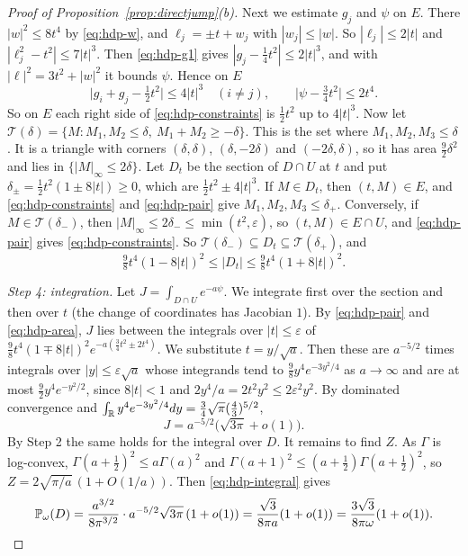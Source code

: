 \begin{proof}[Proof of Proposition~\ref{prop:directjump}(b)]
Next we estimate $g_j$ and $\psi$ on $E$. There $|w|^2\le8t^4$ by
\eqref{eq:hdp-w}, and $\ell_j=\pm t+w_j$ with $|w_j|\le|w|$. So
$|\ell_j|\le2|t|$ and $|\ell_j^2-t^2|\le7|t|^3$. Then \eqref{eq:hdp-g1} gives
$|g_j-\frac14t^2|\le2|t|^3$, and with $|\ell|^2=3t^2+|w|^2$ it bounds $\psi$.
Hence on $E$
\begin{equation}\label{eq:hdp-pair}
 \bigl|g_i+g_j-\tfrac12t^2\bigr|\le4|t|^3\quad(i\ne j),
 \qquad\bigl|\psi-\tfrac34t^2\bigr|\le2t^4.
\end{equation}
So on $E$ each right side of \eqref{eq:hdp-constraints} is $\frac12t^2$ up to
$4|t|^3$. Now let
$\mathcal T(\delta)=\{M:M_1,M_2\le\delta,\ M_1+M_2\ge-\delta\}$. This is the
set where $M_1,M_2,M_3\le\delta$. It is a triangle with corners
$(\delta,\delta)$, $(\delta,-2\delta)$ and $(-2\delta,\delta)$, so it has area
$\frac92\delta^2$ and lies in $\{|M|_\infty\le2\delta\}$. Let $D_t$ be the
section of $D\cap U$ at $t$ and put $\delta_\pm=\frac12t^2(1\pm8|t|)\ge0$,
which are $\frac12t^2\pm4|t|^3$. If $M\in D_t$, then $(t,M)\in E$, and
\eqref{eq:hdp-constraints} and \eqref{eq:hdp-pair} give
$M_1,M_2,M_3\le\delta_+$. Conversely, if $M\in\mathcal T(\delta_-)$, then
$|M|_\infty\le2\delta_-\le\min(t^2,\varepsilon)$, so $(t,M)\in E\cap U$, and
\eqref{eq:hdp-pair} gives \eqref{eq:hdp-constraints}. So
$\mathcal T(\delta_-)\subseteq D_t\subseteq\mathcal T(\delta_+)$, and
\begin{equation}\label{eq:hdp-area}
 \tfrac98t^4(1-8|t|)^2\le|D_t|\le\tfrac98t^4(1+8|t|)^2.
\end{equation}

\emph{Step 4: integration.} Let $J=\int_{D\cap U}e^{-a\psi}$. We integrate
first over the section and then over $t$ (the change of coordinates has
Jacobian $1$). By \eqref{eq:hdp-pair} and \eqref{eq:hdp-area}, $J$ lies
between the integrals over $|t|\le\varepsilon$ of
$\frac98t^4(1\mp8|t|)^2e^{-a(\frac34t^2\pm2t^4)}$. We substitute
$t=y/\sqrt a$. Then these are $a^{-5/2}$ times integrals over
$|y|\le\varepsilon\sqrt a$ whose integrands tend to $\frac98y^4e^{-3y^2/4}$ as
$a\to\infty$ and are at most $\frac92y^4e^{-y^2/2}$, since $8|t|<1$ and
$2y^4/a=2t^2y^2\le2\varepsilon^2y^2$. By dominated convergence and
$\int_{\mathbb R}y^4e^{-3y^2/4}dy=\frac34\sqrt\pi(\frac43)^{5/2}$,
\[
 J=a^{-5/2}\bigl(\sqrt{3\pi}+o(1)\bigr).
\]
By Step 2 the same holds for the integral over $D$. It remains to find $Z$. As
$\Gamma$ is log-convex, $\Gamma(a+\frac12)^2\le a\Gamma(a)^2$ and
$\Gamma(a+1)^2\le(a+\frac12)\Gamma(a+\frac12)^2$, so
$Z=2\sqrt{\pi/a}\,(1+O(1/a))$. Then \eqref{eq:hdp-integral} gives
\[
 \mathbb P_\omega(D)=\frac{a^{3/2}}{8\pi^{3/2}}\cdot a^{-5/2}\sqrt{3\pi}\,(1+o(1))
 =\frac{\sqrt3}{8\pi a}(1+o(1))=\frac{3\sqrt3}{8\pi\omega}(1+o(1)).
 \qedhere
\]
\end{proof}
